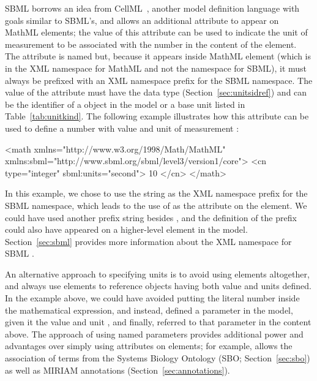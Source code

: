 SBML borrows an idea from CellML~\citep{hedley:2001b}, another
model definition language with goals similar to SBML's, and allows
an additional attribute to appear on MathML  elements;
the value of this attribute can be used to indicate the unit of
measurement to be associated with the number in the content of the
 element.  The attribute is named  but,
because it appears inside MathML element (which is in the XML
namespace for MathML and not the namespace for SBML), it must
always be prefixed with an XML namespace prefix for the SBML
\thisLV namespace.  The value of the attribute must have the data
type  (Section~\ref{sec:unitsidref}) and can
be the identifier of a \UnitDefinition object in the model or a
base unit listed in Table~\vref{tab:unitkind}.  The following
example illustrates how this attribute can be used to define a
number with value  and unit of measurement :
\vspace*{-0.5ex}
\begin{example}
<math xmlns="http://www.w3.org/1998/Math/MathML"
      xmlns:sbml="http://www.sbml.org/sbml/level3/version1/core">
    <cn type="integer" sbml:units="second"> 10 </cn>
</math>
\end{example} 
\vspace*{-0.5ex}
In this example, we chose to use the string  as the XML
namespace prefix for the SBML \thisLV namespace, which leads to
the use of  as the attribute on the 
element.  We could have used another prefix string besides
, and the definition of the prefix could also have
appeared on a higher-level element in the model.
Section~\ref{sec:sbml} provides more information about the XML
namespace for SBML \thisLV.

An alternative approach to specifying units is to avoid using
 elements altogether, and always use  elements
to reference \Parameter objects having both value and units
defined.  In the example above, we could have avoided putting the
literal number  inside the mathematical expression, and
instead, defined a parameter in the model, given it the value
 and unit , and finally, referred to that
parameter in the  content above.  The approach of
using named parameters provides additional power and advantages
over simply using  attributes on 
elements; for example, \Parameter allows the association of terms
from the Systems Biology Ontology (SBO; Section~\ref{sec:sbo}) as
well as MIRIAM annotations (Section~\ref{sec:annotations}).


